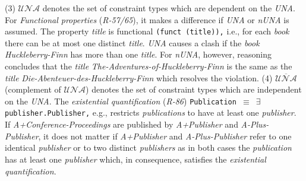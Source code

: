 \documentclass{acm_proc_article-sp}
\newcommand{\ms}[1]{%
  \texttt{#1}
}
\begin{document}
(3) $\mathcal{UNA}$ denotes the set of constraint types which are dependent on the \emph{UNA}.
For \emph{Functional properties} (\emph{R-57/65}), it makes a difference if \emph{UNA} or \emph{nUNA} is assumed.
The property \emph{title} is functional {\small\ms{(funct (title)),}} i.e., for each \emph{book} there can be at most one distinct \emph{title}.
\emph{UNA} causes a clash
if the \emph{book} {\em Huckleberry-Finn} has more than one \emph{title}.
For \emph{nUNA}, however, reasoning concludes that the \emph{title} {\em The-Adventures-of-Huckleberry-Finn} is the same as the \emph{title} {\em Die-Abenteuer-des-Huckleberry-Finn} 
which resolves the violation. 
(4) $\overline{\mathcal{UNA}}$ (complement of $\mathcal{UNA}$) denotes the set of constraint types which are independent on the \emph{UNA}.
The {\em existential quantification} (\emph{R-86}) {\small\ms{Publication $\equiv$ $\exists$ publisher.Publisher,}} e.g., restricts \emph{publications} to have at least one \emph{publisher}.
If \emph{A+Conference-Proceedings} are published by \emph{A+Publisher} and \emph{A-Plus-Publisher},
it does not matter if \emph{A+Publisher} and \emph{A-Plus-Publisher} refer to one identical \emph{publisher} or to two distinct \emph{publishers}
as in both cases the \emph{publication} has at least one \emph{publisher} which, in consequence, satisfies the \emph{existential quantification}.
\end{document}
